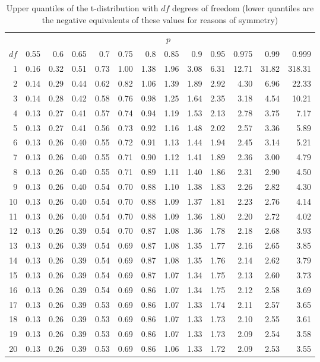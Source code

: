 \begin{table}[!ht]
\centering
\begin{tabular}{rrrrrrrrrrrrr}
   & \multicolumn{12}{c}{$p$} \\ \cline{2-13}
 $df$  & 0.55 & 0.6 & 0.65 & 0.7 & 0.75 & 0.8 & 0.85 & 0.9 & 0.95 & 0.975 & 0.99 & 0.999\\ 
  \hline
  1 & 0.16 & 0.32 & 0.51 & 0.73 & 1.00 & 1.38 & 1.96 & 3.08 & 6.31 & 12.71 & 31.82 & 318.31 \\ 
  2 & 0.14 & 0.29 & 0.44 & 0.62 & 0.82 & 1.06 & 1.39 & 1.89 & 2.92 & 4.30 & 6.96 & 22.33 \\ 
  3 & 0.14 & 0.28 & 0.42 & 0.58 & 0.76 & 0.98 & 1.25 & 1.64 & 2.35 & 3.18 & 4.54 & 10.21 \\ 
  4 & 0.13 & 0.27 & 0.41 & 0.57 & 0.74 & 0.94 & 1.19 & 1.53 & 2.13 & 2.78 & 3.75 & 7.17 \\ 
  5 & 0.13 & 0.27 & 0.41 & 0.56 & 0.73 & 0.92 & 1.16 & 1.48 & 2.02 & 2.57 & 3.36 & 5.89 \\ 
  6 & 0.13 & 0.26 & 0.40 & 0.55 & 0.72 & 0.91 & 1.13 & 1.44 & 1.94 & 2.45 & 3.14 & 5.21 \\ 
  7 & 0.13 & 0.26 & 0.40 & 0.55 & 0.71 & 0.90 & 1.12 & 1.41 & 1.89 & 2.36 & 3.00 & 4.79 \\ 
  8 & 0.13 & 0.26 & 0.40 & 0.55 & 0.71 & 0.89 & 1.11 & 1.40 & 1.86 & 2.31 & 2.90 & 4.50 \\ 
  9 & 0.13 & 0.26 & 0.40 & 0.54 & 0.70 & 0.88 & 1.10 & 1.38 & 1.83 & 2.26 & 2.82 & 4.30 \\ 
  10 & 0.13 & 0.26 & 0.40 & 0.54 & 0.70 & 0.88 & 1.09 & 1.37 & 1.81 & 2.23 & 2.76 & 4.14 \\ 
  11 & 0.13 & 0.26 & 0.40 & 0.54 & 0.70 & 0.88 & 1.09 & 1.36 & 1.80 & 2.20 & 2.72 & 4.02 \\ 
  12 & 0.13 & 0.26 & 0.39 & 0.54 & 0.70 & 0.87 & 1.08 & 1.36 & 1.78 & 2.18 & 2.68 & 3.93 \\ 
  13 & 0.13 & 0.26 & 0.39 & 0.54 & 0.69 & 0.87 & 1.08 & 1.35 & 1.77 & 2.16 & 2.65 & 3.85 \\ 
  14 & 0.13 & 0.26 & 0.39 & 0.54 & 0.69 & 0.87 & 1.08 & 1.35 & 1.76 & 2.14 & 2.62 & 3.79 \\ 
  15 & 0.13 & 0.26 & 0.39 & 0.54 & 0.69 & 0.87 & 1.07 & 1.34 & 1.75 & 2.13 & 2.60 & 3.73 \\ 
  16 & 0.13 & 0.26 & 0.39 & 0.54 & 0.69 & 0.86 & 1.07 & 1.34 & 1.75 & 2.12 & 2.58 & 3.69 \\ 
  17 & 0.13 & 0.26 & 0.39 & 0.53 & 0.69 & 0.86 & 1.07 & 1.33 & 1.74 & 2.11 & 2.57 & 3.65 \\ 
  18 & 0.13 & 0.26 & 0.39 & 0.53 & 0.69 & 0.86 & 1.07 & 1.33 & 1.73 & 2.10 & 2.55 & 3.61 \\ 
  19 & 0.13 & 0.26 & 0.39 & 0.53 & 0.69 & 0.86 & 1.07 & 1.33 & 1.73 & 2.09 & 2.54 & 3.58 \\ 
  20 & 0.13 & 0.26 & 0.39 & 0.53 & 0.69 & 0.86 & 1.06 & 1.33 & 1.72 & 2.09 & 2.53 & 3.55 \\  
   \hline
\end{tabular}
\caption{Upper quantiles of the t-distribution with $df$ degrees of freedom (lower quantiles are the negative equivalents of these values for reasons of symmetry)} 
\end{table}


